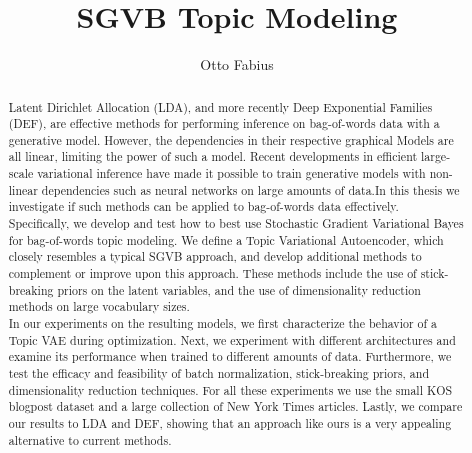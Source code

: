 \documentclass{report}
\author{Otto Fabius}
\title{SGVB Topic Modeling}
\begin{document}
\large
\doublespacing
\maketitle

\begin{abstract}
	Latent Dirichlet Allocation (LDA), and more recently Deep Exponential Families (DEF), are effective methods for performing inference on bag-of-words data with a generative model. However, the dependencies in their respective graphical Models are all linear, limiting the power of such a model. Recent developments in efficient large-scale variational inference have made it possible to train generative models with non-linear dependencies such as neural networks on large amounts of data.In this thesis we investigate if such methods can be applied to bag-of-words data effectively. \\
	Specifically, we develop and test how to best use Stochastic Gradient Variational Bayes for bag-of-words topic modeling. We define a Topic Variational Autoencoder, which closely resembles a typical SGVB approach, and develop additional methods to complement or improve upon this approach. These methods include the use of stick-breaking priors on the latent variables, and the use of dimensionality reduction methods on large vocabulary sizes.\\
	In our experiments on the resulting models, we first  characterize the behavior of a Topic VAE during optimization. Next, we experiment with different architectures and examine its performance when trained to different amounts of data. Furthermore, we test the efficacy and feasibility of batch normalization, stick-breaking priors, and dimensionality reduction techniques. For all these experiments we use the small KOS blogpost dataset and a large collection of New York Times articles. Lastly, we compare our results to LDA and DEF, showing that an approach like ours is a very appealing alternative to current methods.

\end{abstract}
\chapter*{}
\onehalfspacing
\end{document}
